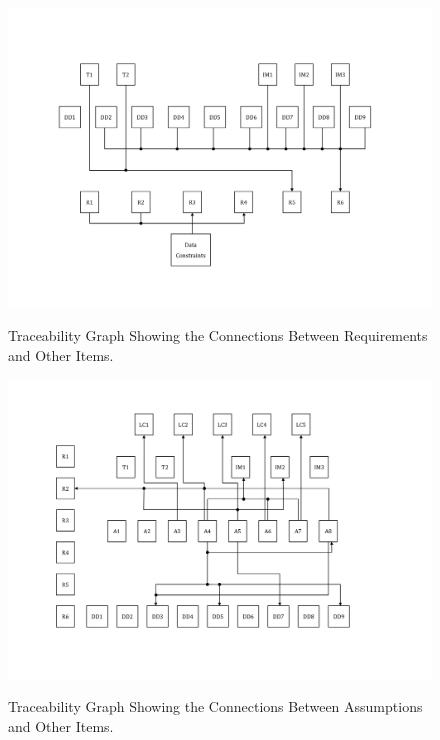 \documentclass[12pt]{article}
\begin{document}
\begin{figure}[h!]
	\begin{center}
		{
			\includegraphics[width=\textwidth]{RTrace.png}
		}
		\caption{\label{Fig_RTrace} Traceability Graph Showing the Connections Between Requirements and Other Items.}
	\end{center}
\end{figure}

\clearpage

\begin{figure}[h!]
	\begin{center}
		{
			\includegraphics[width=\textwidth]{ATrace.png}
		}
		\caption{\label{Fig_ATrace} Traceability Graph Showing the Connections Between Assumptions and Other Items.}
	\end{center}
\end{figure} 
\end{document}
